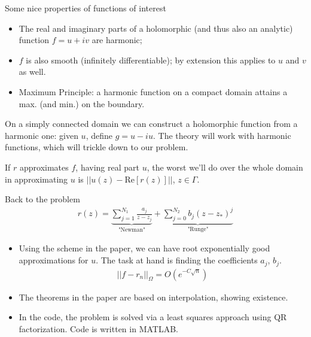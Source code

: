 \documentclass{seminar}
\begin{document}
\begin{slide} %
\large Some nice properties of functions of interest \\

\small
\begin{itemize}
	\item The real and imaginary parts of a holomorphic (and thus also an analytic) function $f=u+iv$ are harmonic;
	\item $f$ is also smooth (infinitely differentiable); by extension this applies to $u$ and $v$ as well.
	\item Maximum Principle: a harmonic function on a compact domain attains a max. (and min.) on the boundary.
\end{itemize}

On a simply connected domain we can construct a holomorphic function from a harmonic one: given $u$, define $g=u-iu$. The theory will work with harmonic functions, which will trickle down to our problem.

If $r$ approximates $f$, having real part $u$, the worst we'll do over the whole domain in approximating $u$ is $||u(z)-\mathrm{Re}[r(z)]||$, $z \in \Gamma$.
\end{slide} %




\begin{slide} %
\large Back to the problem \\
\small
\begin{align*}
r(z) = \underbrace{\sum_{j=1}^{N_1} \frac{a_j}{z-z_j}}_\text{"Newman"} + \underbrace{\sum_{j=0}^{N_2} b_j (z-z_*)^j}_\text{"Runge"}
\end{align*}

\begin{itemize}
	\item Using the scheme in the paper, we can have root exponentially good approximations for $u$. The task at hand is finding the coefficients $a_j$, $b_j$.
	\begin{align*}
	||f-r_n||_\Omega = O(e^{-C\sqrt{n}})
	\end{align*}
	\item The theorems in the paper are based on interpolation, showing existence.
	\item In the code, the problem is solved via a least squares approach using QR factorization. Code is written in MATLAB.
\end{itemize}
\end{slide} %
\end{document}

